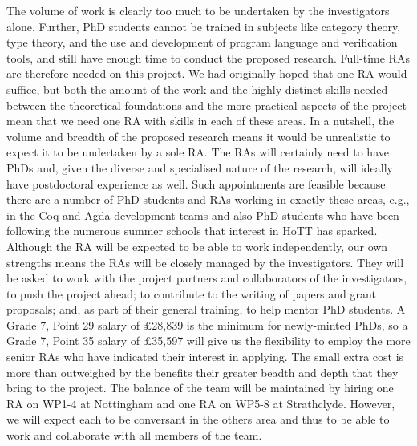 \documentclass[a4paper,11pt]{article}
\begin{document}
 The volume of work is clearly too much to be
undertaken by the investigators alone. Further, PhD students cannot be
trained in subjects like category theory, type theory, and the use and
development of program language and verification tools, and still have
enough time to conduct the proposed research. Full-time RAs are
therefore needed on this project. We had originally hoped that one RA
would suffice, but both the amount of the work and the highly distinct
skills needed between the theoretical foundations and the more
practical aspects of the project mean that we need one RA with skills
in each of these areas. In a nutshell, the volume and breadth of the
proposed research means it would be unrealistic to expect it to be
undertaken by a sole RA. The RAs will certainly need to have PhDs and,
given the diverse and specialised nature of the research, will ideally
have postdoctoral experience as well.  Such appointments are feasible
because there are a number of PhD students and RAs working in exactly
these areas, e.g., in the Coq and Agda development teams and also PhD
students who have been following the numerous summer schools that
interest in HoTT has sparked.  Although the RA will be expected to be
able to work independently, our own strengths means the RAs will be
closely managed by the investigators. They will be asked to work with
the project partners and collaborators of the investigators, to push
the project ahead; to contribute to the writing of papers and grant
proposals; and, as part of their general training, to help mentor PhD
students. A Grade 7, Point 29 salary of $\pounds$28,839 is the minimum
for newly-minted PhDs, so a Grade 7, Point 35 salary of
$\pounds$35,597 will give us the flexibility to employ the more senior
RAs who have indicated their interest in applying. The small extra
cost is more than outweighed by the benefits their greater beadth and
depth that they bring to the project. The balance of the team will be
maintained by hiring one RA on WP1-4 at Nottingham and one RA on WP5-8
at Strathclyde. However, we will expect each to be conversant in the
others area and thus to be able to work and collaborate with all
members of the team.

\end{document}
